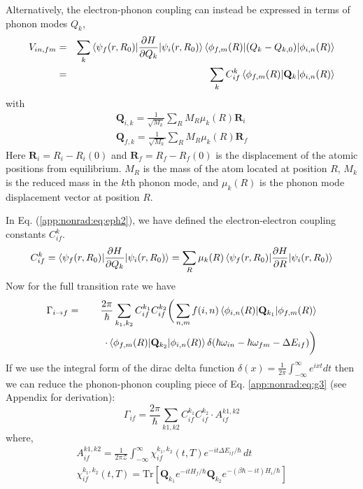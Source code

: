 Alternatively, the electron-phonon coupling can instead be expressed in terms of phonon modes $Q_k$,
\begin{eqnarray}
    V_{in,fm}
    &=&
    \sum_k \braket{\psi_f(r,R_0)|
    \frac{\partial H}{\partial Q_k}|\psi_i(r,R_0)}
    \braket{\phi_{f,m}(R)|(Q_k-Q_{k,0})|\phi_{i,n}(R)} \\
    &=& \sum_k C^k_{if}\braket{\phi_{f,m}(R)|
    \mathbf{Q}_k|\phi_{i,n}(R)} \label{app:nonrad:eq:eph2}
\end{eqnarray}
with
\begin{eqnarray}
    \mathbf{Q}_{i,k}=\frac{1}{\sqrt{M_k}}\sum_R M_R \mu_k(R) \mathbf{R}_i \nonumber \\
    \mathbf{Q}_{f,k}=\frac{1}{\sqrt{M_k}}\sum_R M_R \mu_k(R) \mathbf{R}_f
\end{eqnarray}
Here $\mathbf{R}_i = R_i - R_i(0)$ and  $\mathbf{R}_f = R_f - R_f(0)$ is the displacement of the atomic positions from equilibrium. $M_R$ is the mass of the atom located at position $R$, $M_k$ is the reduced mass in the $k$th phonon mode, and $\mu_k(R)$ is the phonon mode displacement vector at position $R$.

In Eq. (\ref{app:nonrad:eq:eph2}), we have defined the electron-electron coupling constants $C^k_{if}$.
\begin{equation}
    C^k_{if}
    = \braket{\psi_f(r,R_0)|
    \frac{\partial H}{\partial Q_k}|\psi_i(r,R_0)}
    =\sum_R \mu_k(R) \braket{\psi_f(r,R_0)|
    \frac{\partial H}{\partial R}|\psi_i(r,R_0)}
\end{equation}
Now for the full transition rate we have
\begin{eqnarray}
    \Gamma_{i\rightarrow f}&=& \frac{2\pi}{\hbar}\sum_{k_1,k_2} C^{k_1}_{if} C^{k_2}_{if}
    \bigg( \sum_{n,m} f(i,n) \braket{\phi_{i,n}(R)|
    \mathbf{Q}_{k_1}|\phi_{f,m}(R)} \nonumber \\
    && \hspace{6mm} \cdot
    \braket{\phi_{f,m}(R)|\mathbf{Q}_{k_2}|\phi_{i,n}(R)}
    \delta(\hbar\omega_{in}-\hbar\omega_{fm}-\Delta E_{if}) \bigg) \label{app:nonrad:eq:g3}
\end{eqnarray}
If we use the integral form of the dirac delta function $\delta(x)=\frac{1}{2\pi}\int_{-\infty}^{\infty}e^{ixt}dt$
then we can reduce the phonon-phonon coupling piece of Eq. \ref{app:nonrad:eq:g3} (see Appendix for derivation):
\begin{equation}
    \Gamma_{if}=\frac{2\pi}{\hbar} \sum_{k1,k2} C^{k_1}_{if}C^{k_2}_{if}\cdot A^{k1,k2}_{if} \label{app:nonrad:eq:g4}
\end{equation}
where,
\begin{align}
    A^{k1,k2}_{if}=\frac{1}{2\pi \mathcal{Z}}\int_{-\infty}^{\infty}\chi^{k_1,k_2}_{if}(t,T)e^{-it\Delta E_{if}/\hbar}\,dt \label{app:nonrad:eq:a}\\
    \chi^{k_1,k_2}_{if}(t,T) = \text{Tr}\left[ \mathbf{Q}_{k_1} e^{-it H_{f}/\hbar}
    \mathbf{Q}_{k_2}e^{-(\beta\hbar-it)H_{i}/\hbar} \right] \label{app:nonrad:eq:chi}
\end{align}



